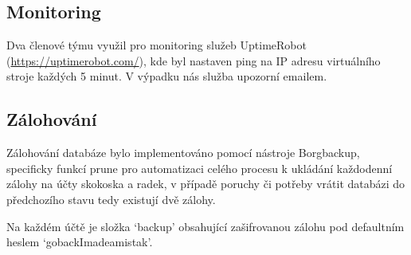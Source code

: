 \subsection{Monitoring}
Dva členové týmu využil pro monitoring služeb UptimeRobot (\href{https://uptimerobot.com/}{https://uptimerobot.com/}), kde byl nastaven ping na IP adresu virtuálního stroje každých 5 minut. V výpadku nás služba upozorní emailem.

\subsection{Zálohování}
Zálohování databáze bylo implementováno pomocí nástroje Borgbackup, specificky funkcí prune pro automatizaci celého procesu k ukládání každodenní zálohy na účty skokoska a radek, v případě poruchy či potřeby vrátit databázi do předchozího stavu tedy existují dvě zálohy.

Na každém účtě je složka `backup' obsahující zašifrovanou zálohu pod defaultním heslem `gobackImadeamistak'.